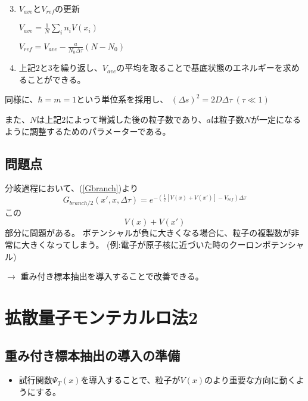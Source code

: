 \documentclass[dvipdfmx]{beamer}
\begin{document}
    \begin{frame}
        \begin{enumerate}
            \setcounter{enumi}{2}
            \item $V_{ave}$と$V_{ref}$の更新

            $V_{ave} = \frac{1}{N}\sum_{i} n_i V(x_i)$

            $V_{ref} = V_{ave} - \frac{a}{N_0\Delta\tau}(N-N_0)$

            \item 上記$2$と$3$を繰り返し、$V_{ave}$の平均を取ることで基底状態のエネルギーを求めることができる。
        \end{enumerate}
        同様に、$\hbar = m = 1$という単位系を採用し、
        $(\Delta s)^2 = 2D\Delta \tau~(\tau \ll 1)$

        また、$N$は上記$2$によって増減した後の粒子数であり、$a$は粒子数$N$が一定になるように調整するためのパラメーターである。
    \end{frame}

    \subsection{問題点}

    \begin{frame}{\insertsubsection}
      分岐過程において、(\ref{Gbranch})より
      \begin{equation}
        G_{branch/2}(x',x,\Delta\tau) = e^{-(\frac{1}{2}[V(x)+V(x')]-V_{ref})\Delta\tau} \nonumber
      \end{equation}
      この
      \begin{equation}
        V(x)+V(x')
      \end{equation}
      部分に問題がある。
      \vfill
      ポテンシャルが負に大きくなる場合に、粒子の複製数が非常に大きくなってしまう。
      (例:電子が原子核に近づいた時のクーロンポテンシャル)

      $\to$ 重み付き標本抽出を導入することで改善できる。
    \end{frame}


    \section{拡散量子モンテカルロ法2}

    \subsection{重み付き標本抽出の導入の準備}
    \begin{frame}{\insertsubsection}
      \begin{itemize}
        \item 試行関数$\Psi_T(x)$を導入することで、粒子が$V(x)$のより重要な方向に動くようにする。
      \end{itemize}

    \end{frame}
\end{document}
